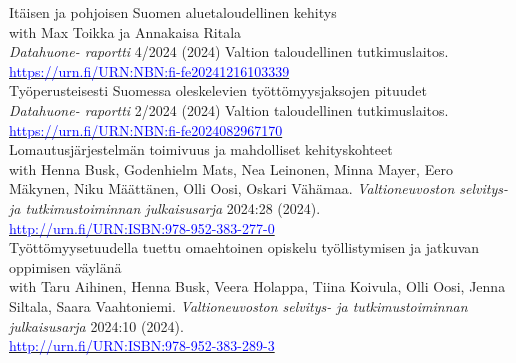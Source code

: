 \documentclass[16pt]{article}
\begin{document}
\noindent Itäisen ja pohjoisen Suomen aluetaloudellinen kehitys \\
\noindent with Max Toikka ja Annakaisa Ritala \\
\noindent \textit{Datahuone- raportti} 4/2024 (2024) Valtion taloudellinen tutkimuslaitos. \\
\noindent \href{https://urn.fi/URN:NBN:fi-fe20241216103339}{\textcolor{blue}{https://urn.fi/URN:NBN:fi-fe20241216103339}} \\

\noindent Työperusteisesti Suomessa oleskelevien työttömyysjaksojen pituudet \\
\noindent \textit{Datahuone- raportti} 2/2024 (2024) Valtion taloudellinen tutkimuslaitos. \\
\noindent \href{https://urn.fi/URN:NBN:fi-fe2024082967170}{\textcolor{blue}{https://urn.fi/URN:NBN:fi-fe2024082967170}} \\

\noindent Lomautusjärjestelmän toimivuus ja mahdolliset kehityskohteet \\
\noindent with Henna Busk, Godenhielm Mats, Nea Leinonen, Minna Mayer, Eero Mäkynen, Niku Määttänen, Olli Oosi, Oskari Vähämaa. \textit{Valtioneuvoston selvitys- ja tutkimustoiminnan julkaisusarja} 2024:28 (2024). \\
\noindent \href{http://urn.fi/URN:ISBN:978-952-383-277-0}{\textcolor{blue}{http://urn.fi/URN:ISBN:978-952-383-277-0}} \\

\noindent Työttömyysetuudella tuettu omaehtoinen opiskelu työllistymisen ja jatkuvan oppimisen väylänä\\
\noindent with Taru Aihinen, Henna Busk, Veera Holappa, Tiina Koivula, Olli Oosi, Jenna Siltala, Saara Vaahtoniemi. \textit{Valtioneuvoston selvitys- ja tutkimustoiminnan julkaisusarja} 2024:10 (2024). \\
\noindent \href{http://urn.fi/URN:ISBN:978-952-383-289-3}{\textcolor{blue}{http://urn.fi/URN:ISBN:978-952-383-289-3}} \\
\end{document}
